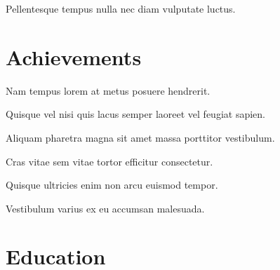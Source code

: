 \documentclass[sidebar]{mjresume}
\begin{document}
\begin{main}
	\begin{bullets}
		\item Pellentesque tempus nulla nec diam vulputate luctus.
	\end{bullets}
	
	\section{Achievements}
	
	\begin{bullets}
		\item Nam tempus lorem at metus posuere hendrerit.
		\item Quisque vel nisi quis lacus semper laoreet vel feugiat sapien.
		\item Aliquam pharetra magna sit amet massa porttitor vestibulum.
		\item Cras vitae sem vitae tortor efficitur consectetur.
		\item Quisque ultricies enim non arcu euismod tempor.
		\item Vestibulum varius ex eu accumsan malesuada.
	\end{bullets}
	
	\section{Education}
	
	
\end{main}
\end{document}
